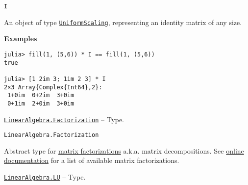 \begin{adjustwidth}{2em}{0pt}


\begin{verbatim}
I
\end{verbatim}

An object of type \hyperlink{723087258311673942}{\texttt{UniformScaling}}, representing an identity matrix of any size.

\textbf{Examples}


\begin{verbatim}
julia> fill(1, (5,6)) * I == fill(1, (5,6))
true

julia> [1 2im 3; 1im 2 3] * I
2×3 Array{Complex{Int64},2}:
 1+0im  0+2im  3+0im
 0+1im  2+0im  3+0im
\end{verbatim}



\end{adjustwidth}
\hypertarget{3230130194560201438}{} 
\hyperlink{3230130194560201438}{\texttt{LinearAlgebra.Factorization}}  -- {Type.}

\begin{adjustwidth}{2em}{0pt}


\begin{verbatim}
LinearAlgebra.Factorization
\end{verbatim}

Abstract type for \href{https://en.wikipedia.org/wiki/Matrix\_decomposition}{matrix factorizations} a.k.a. matrix decompositions. See \hyperlink{14017178414387426770}{online documentation} for a list of available matrix factorizations.



\end{adjustwidth}
\hypertarget{9094854913402033490}{} 
\hyperlink{9094854913402033490}{\texttt{LinearAlgebra.LU}}  -- {Type.}

